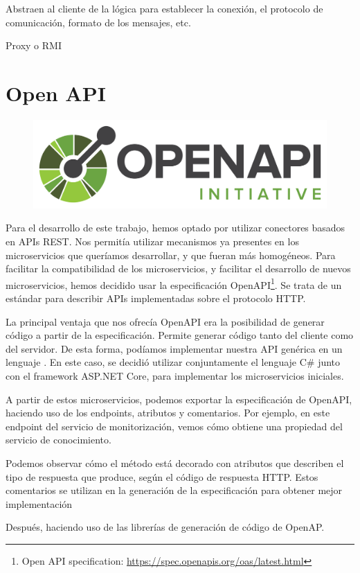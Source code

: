 Abstraen al cliente de la lógica para establecer la conexión, el protocolo de comunicación, formato de los mensajes, etc.

Proxy o RMI

\section{Open API}

\begin{figure}
  \vspace{15pt}
  \includegraphics[scale=0.34]{service_connectors/images/openapi-logo}
  \centering
  \vspace{15pt}
\end{figure}

Para el desarrollo de este trabajo, hemos optado por utilizar conectores basados en APIs REST. Nos permitía utilizar mecanismos ya presentes en los microservicios que queríamos desarrollar, y que fueran más homogéneos.
Para facilitar la compatibilidad de los microservicios, y facilitar el desarrollo de nuevos microservicios, hemos decidido usar la especificación OpenAPI\footnote{Open API specification: \url{https://spec.openapis.org/oas/latest.html}}. Se trata de un estándar para describir APIs implementadas sobre el protocolo HTTP.

La principal ventaja que nos ofrecía OpenAPI era la posibilidad de generar código a partir de la especificación. Permite generar código tanto del cliente como del servidor. De esta forma, podíamos implementar nuestra API genérica en un lenguaje . En este caso, se decidió utilizar conjuntamente el lenguaje C\# junto con el framework ASP.NET Core, para implementar los microservicios iniciales.

A partir de estos microservicios, podemos exportar la especificación de OpenAPI, haciendo uso de los endpoints, atributos y comentarios. Por ejemplo, en este endpoint del servicio de monitorización, vemos cómo obtiene una propiedad del servicio de conocimiento.

Podemos observar cómo el método está decorado con atributos que describen el tipo de respuesta que produce, según el código de respuesta HTTP. Estos comentarios se utilizan en la generación de la especificación para obtener mejor implementación

Después, haciendo uso de las librerías de generación de código de OpenAP.
